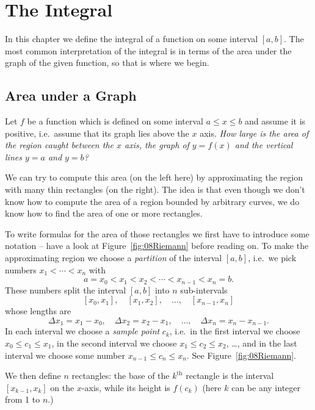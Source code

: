 \chapter{The Integral}
In this chapter we define the integral of a function on some interval
$[a,b]$.  The most common interpretation of the integral is in terms
of the area under the graph of the given function, so that is where we
begin.


\section{Area under a Graph}
Let $f$ be a function which is defined on some interval $a\leq x\leq
b$ and assume it is positive, i.e.\ assume that its graph lies above
the $x$ axis. \textit{How large is the area of the region caught
  between the $x$ axis, the graph of $y=f(x)$ and the vertical lines
  $y=a$ and $y=b$?}
\begin{figure}[h]
    \parbox{0.45\textwidth}{}
    \parbox{0.45\textwidth}{}
\end{figure}
We can try to compute this area (on the left here) by approximating
the region with many thin rectangles (on the right).  The idea is that
even though we don't know how to compute the area of a region bounded
by arbitrary curves, we do know how to find the area of one or more
rectangles.

To write formulas for the area of those rectangles we first have to
introduce some notation -- have a look at Figure~\ref{fig:08Riemann}
before reading on.  To make the approximating region we choose a
\emph{partition} of the interval $[a, b]$, i.e.\ we pick numbers
$x_1<\cdots<x_n$ with
\[
a=x_0 < x_1 < x_2 < \cdots < x_{n-1}< x_n = b.
\]
These numbers split the interval $[a, b]$ into $n$ sub-intervals
\[
[x_0, x_1], \quad [x_1, x_2],\quad \ldots,\quad [x_{n-1}, x_n]
\]
whose lengths are
\[
\Delta x_1 = x_1-x_0, \quad \Delta x_2 = x_2 - x_1, \quad\ldots, \quad
\Delta x_n = x_n-x_{n-1}.
\]
In each interval we choose a \emph{sample point} $c_k$, i.e.\ in the first
interval we choose $x_0\leq c_1\leq x_1$, in the second interval we choose
$x_1\leq c_2\leq x_2$, \ldots, and in the last interval we choose some number
$x_{n-1}\leq c_n \leq x_n$.  See Figure~\ref{fig:08Riemann}.

We then define $n$ rectangles: the base of the $k^{\textrm{th}}$ rectangle is
the interval $[x_{k-1}, x_k]$ on the $x$-axis, while its height is $f(c_k)$
(here $k$ can be any integer from 1 to $n$.)

